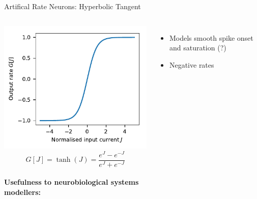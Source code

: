 \documentclass[handout,aspectratio=169]{beamer}
\begin{document}
\begin{frame}{Artifical Rate Neurons: Hyperbolic Tangent}
	\begin{columns}
	\includegraphics[width=\textwidth]{media/nonlinearity_tanh.pdf}%
	$$G[J] = \tanh(J) = \frac{e^J - e^{-J}}{e^J + e^{-J}}$$\\[0.5cm]
	\textbf{Usefulness to neurobiological systems\\modellers:}
	\begin{itemize}
		\item[\OMeh] Models smooth spike onset and saturation (?)
		\item[\OMinus] Negative rates
	\end{itemize}
	\end{columns}	
\end{frame}
\end{document}
